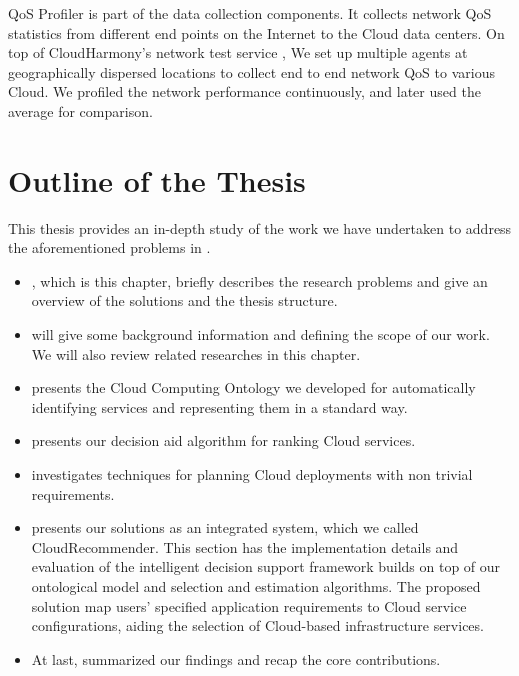 QoS Profiler is part of the data collection components.
It collects network QoS statistics from different end points on the Internet to the Cloud data centers.
On top of CloudHarmony's network test service \cite{Cloudharmony_speedtest}, We set up multiple agents at geographically dispersed locations to collect end to end network QoS to various Cloud.
We profiled the network performance continuously, and later used the average for comparison.

\section{Outline of the Thesis}
This thesis provides an in-depth study of the work we have undertaken to address the aforementioned problems in .
\begin{itemize}
\item {}, which is this chapter, briefly describes the research problems and give an overview of the solutions and the thesis structure.

\item {} will give some background information and defining the scope of our work. We will also review related researches in this chapter.

\item {} presents the Cloud Computing Ontology we developed for automatically identifying services and representing them in a standard way.

\item {} presents our decision aid algorithm for ranking Cloud services.

\item {} investigates techniques for planning Cloud deployments with non trivial requirements.

\item {} presents our solutions as an integrated system, which we called CloudRecommender.
This section has the implementation details and evaluation of the intelligent decision support framework builds on top of our ontological model and selection and estimation algorithms.
The proposed solution map users’ specified application
requirements to Cloud service configurations, aiding the selection 
of Cloud-based infrastructure services.

\item At last,  summarized our findings and recap the core contributions.
\end{itemize}